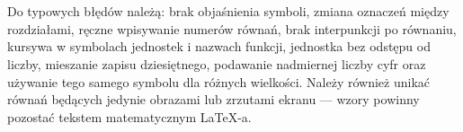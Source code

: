 \section{}

Do typowych błędów należą: brak objaśnienia symboli, zmiana oznaczeń między rozdziałami,
ręczne wpisywanie numerów równań, brak interpunkcji po równaniu, kursywa w symbolach
jednostek i nazwach funkcji, jednostka bez odstępu od liczby, mieszanie zapisu
dziesiętnego, podawanie nadmiernej liczby cyfr oraz używanie tego samego symbolu dla
różnych wielkości. Należy również unikać równań będących jedynie obrazami lub zrzutami
ekranu --- wzory powinny pozostać tekstem matematycznym LaTeX-a.
